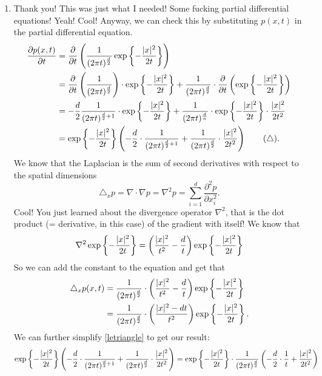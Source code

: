 \documentclass[12pt]{report}
\begin{document}
\begin{enumerate}
	\item Thank you! This was just what I needed! Some fucking partial differential equations! Yeah! Cool! Anyway, we can check this by substituting $p(x,t)$ in the partial differential equation.
	\begin{align*}
		\frac{\partial p(x,t)}{\partial t}&=\frac{\partial}{\partial t}\left(\frac{1}{(2\pi t)^{\frac{d}{2}}}\exp\left\{-\frac{|x|^{2}}{2t}\right\}\right)\\
		&=\frac{\partial}{\partial t}\left(\frac{1}{(2\pi t)^{\frac{d}{2}}}\right)\cdot\exp\left\{-\frac{|x|^{2}}{2t}\right\}+\frac{1}{(2\pi t)^{\frac{d}{2}}}\cdot\frac{\partial}{\partial t}\left(\exp\left\{-\frac{|x|^{2}}{2t}\right\}\right)\\
		&=-\frac{d}{2}\frac{1}{(2\pi t)^{\frac{d}{2}+1}}\cdot \exp\left\{-\frac{|x|^{2}}{2t}\right\}+\frac{1}{(2\pi t)^{\frac{d}{n}}}\cdot\exp\left\{-\frac{|x|^{2}}{2t}\right\}\cdot\frac{|x|^{2}}{2t^{2}}\\
		&=\exp\left\{-\frac{|x|^{2}}{2t}\right\}\left(-\frac{d}{2}\cdot\frac{1}{(2\pi t)^{\frac{d}{2}+1}}+\frac{1}{(2\pi t)^{\frac{d}{2}}}\cdot\frac{|x|^{2}}{2t^{2}}\right)\tag{$\triangle$}\label{letriangle}.
	\end{align*}
	We know that the Laplacian is the sum of second derivatives with respect to the spatial dimensions
	\begin{equation*}
		\triangle_{x}p=\nabla\cdot\nabla p=\nabla^{2}p=\sum_{i=1}^{d}\frac{\partial^{2}p}{\partial x_{i}^{2}}.
	\end{equation*}
	Cool! You just learned about the divergence operator $\nabla^{2}$, that is the dot product (= derivative, in this case) of the gradient with itself!
	We know that 
	\begin{equation*}
		\nabla^{2}\exp\left\{-\frac{|x|^{2}}{2t}\right\}=\left(\frac{|x|^{2}}{t^{2}}-\frac{d}{t}\right)\exp\left\{-\frac{|x|^{2}}{2t}\right\}
	\end{equation*}
	So we can add the constant to the equation and get that
	\begin{align*}
		\triangle_{x}p(x,t)&=\frac{1}{(2\pi t)^{\frac{d}{2}}}\cdot\left(\frac{|x|^{2}}{t^{2}}-\frac{d}{t}\right)\exp\left\{-\frac{|x|^{2}}{2t}\right\}\\
		&=\frac{1}{(2\pi t)^{\frac{d}{2}}}\cdot\left(\frac{|x|^{2}-dt}{t^{2}}\right)\exp\left\{-\frac{|x|^{2}}{2t}\right\}.
	\end{align*}
	We can further simplify \ref{letriangle} to get our result:
	\begin{align*}
		\expg{-\frac{|x|^{2}}{2t}}\left(-\frac{d}{2}\cdot\frac{1}{(2\pi t)^{\frac{d}{2}+1}}+\frac{1}{(2\pi t)^{\frac{d}{2}}}\cdot\frac{|x|^{2}}{2t^{2}}\right)&=	\expg{-\frac{|x|^{2}}{2t}}\cdot\frac{1}{(2\pi t)^{\frac{d}{2}}}\left(-\frac{d}{2}\cdot\frac{1}{t}+\frac{|x|^{2}}{2t^{2}}\right)\\

\end{align*}
\end{enumerate}
\end{document}
